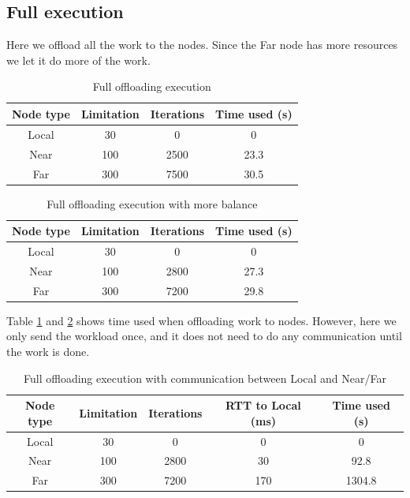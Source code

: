 \subsection{Full execution}
Here we offload all the work to the nodes. Since the Far node has more resources we let it do more of the work.
\begin{table}[h!]
    \centering
    \begin{tabular}[c]{|c|c|c|c|}
        \hline
        Node type & Limitation & Iterations & Time used (s)\\
        \hline
        \hline
        Local & 30 & 0 & 0 \\
        \hline
        Near & 100 & 2500 & 23.3 \\
        \hline
        Far & 300 & 7500 & 30.5 \\
        \hline
    \end{tabular}
    \caption{Full offloading execution}
    \label{tab:MEC_full_execution}
\end{table}

\begin{table}[h!]
    \centering
    \begin{tabular}[c]{|c|c|c|c|}
        \hline
        Node type & Limitation & Iterations & Time used (s)\\
        \hline
        \hline
        Local & 30 & 0 & 0 \\
        \hline
        Near & 100 & 2800 & 27.3 \\
        \hline
        Far & 300 & 7200 & 29.8 \\
        \hline
    \end{tabular}
    \caption{Full offloading execution with more balance}
    \label{tab:MEC_full_execution_balanced}
\end{table}

Table \ref{tab:MEC_full_execution} and \ref{tab:MEC_full_execution_balanced} shows time used when offloading work to nodes. However, here we only send the workload once, and it does not need to do any communication until the work is done.

\begin{table}[h!]
    \centering
    \begin{tabular}[c]{|c|c|c|c|c|}
        \hline
        Node type & Limitation & Iterations & RTT to Local (ms)& Time used (s)\\
        \hline
        \hline
        Local & 30 & 0 & 0 & 0 \\
        \hline
        Near & 100 & 2800 & 30 & 92.8 \\
        \hline
        Far & 300 & 7200 & 170 & 1304.8 \\
        \hline
    \end{tabular}
    \caption{Full offloading execution with communication between Local and Near/Far}
    \label{tab:MEC_full_execution_latency}
\end{table}

